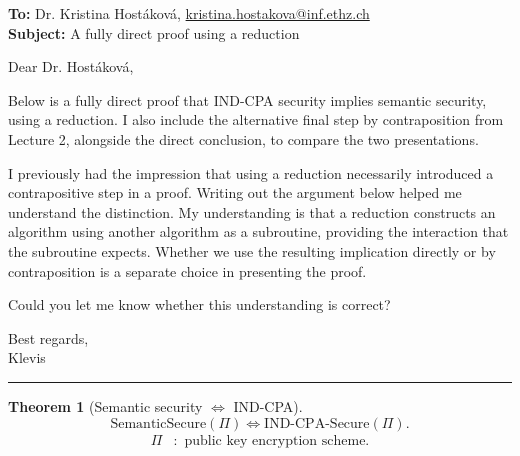 \documentclass[12pt,a4paper]{article}
\newtheorem{theorem}{Theorem}[section]
\theoremstyle{definition}
\theoremstyle{remark}
\begin{document}
\textbf{To:} Dr. Kristina Host\'{a}kov\'{a},
\href{mailto:kristina.hostakova@inf.ethz.ch}{kristina.hostakova@inf.ethz.ch}\\
\textbf{Subject:} A fully direct proof using a reduction

Dear Dr. Host\'{a}kov\'{a},

Below is a fully direct proof that IND-CPA security implies semantic security,
using a reduction. I also include the alternative final
step by contraposition from Lecture 2, alongside the direct conclusion, to
compare the two presentations.

I previously had the impression that using a reduction necessarily introduced
a contrapositive step in a proof. Writing out the argument below helped me
understand the distinction. My understanding is that a reduction constructs
an algorithm using another algorithm as a subroutine, providing the
interaction that the subroutine expects. Whether we use the resulting
implication directly or by contraposition is a separate choice in presenting
the proof.

Could you let me know whether this understanding is correct?

Best regards,\\
Klevis

\medskip\hrule\medskip
\setcounter{section}{1}
\setcounter{theorem}{13}
\begin{theorem}[Semantic security $\iff$ IND-CPA]
\[
\mathrm{SemanticSecure}(\Pi)
\iff\mathrm{IND\text{-}CPA\text{-}Secure}(\Pi).
\]
\[
\begin{aligned}
\Pi&:\text{ public key encryption scheme}.
\end{aligned}
\]
\end{theorem}
\end{document}
